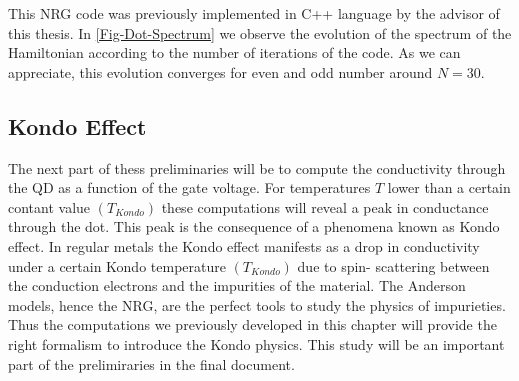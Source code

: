 This NRG code was previously implemented in C++ language by the advisor
of this thesis. In \ref{Fig-Dot-Spectrum} we observe the evolution
of the spectrum of the Hamiltonian according to the number of iterations
of the code. As we can appreciate, this evolution converges for even
and odd number around $N=30$. \\


\subsection{Kondo Effect}

The next part of thess preliminaries will be to compute the conductivity
through the QD as a function of the gate voltage. For temperatures
$T$ lower than a certain contant value $(T_{Kondo})$ these computations
will reveal a peak in conductance through the dot. This peak is the
consequence of a phenomena known as Kondo effect\citep{hewson_kondo_1997}.
In regular metals the Kondo effect manifests as a drop in conductivity
under a certain Kondo temperature $(T_{Kondo})$ due to spin- scattering
between the conduction electrons and the impurities of the material.
The Anderson models, hence the NRG, are the perfect tools to study
the physics of impurieties. Thus the computations we previously developed
in this chapter will provide the right formalism to introduce the
Kondo physics. This study will be an important part of the prelimiraries
in the final document. 

